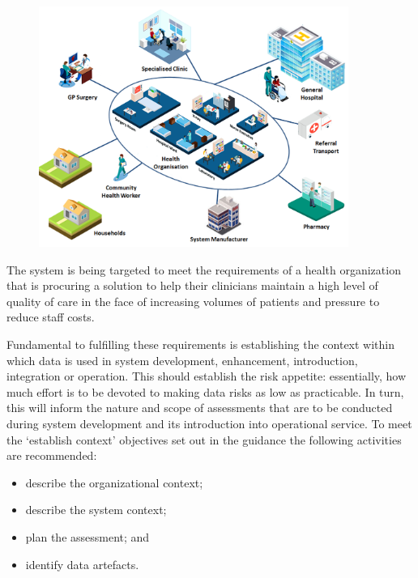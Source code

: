 \begin{figure}[H]
  \centering
  \includegraphics[width=0.9\textwidth]{images/medicalscenario}
  \label{fig:medicalscenario}
\end{figure}

\clearpage
The system is being targeted to meet the requirements of a health organization that is procuring a solution to help their clinicians maintain a high level of quality of care in the face of increasing volumes of patients and pressure to reduce staff costs.

Fundamental to fulfilling these requirements is establishing the context within which data is used in system development, enhancement, introduction, integration or operation. This should establish the risk appetite: essentially, how much effort is to be devoted to making data risks as low as practicable. In turn, this will inform the nature and scope of assessments that are to be conducted during system development and its introduction into operational service. To meet the `establish context' objectives set out in the guidance the following activities are recommended:

\begin{itemize}
	\item describe the organizational context;
	\item describe the system context;
	\item plan the assessment; and
	\item identify \glspl{data artefact}.
\end{itemize}

